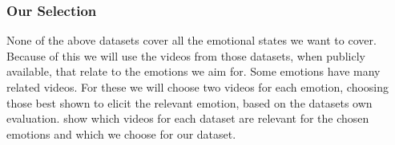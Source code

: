\subsubsection{Our Selection}
None of the above datasets cover all the emotional states we want to cover. Because of this we will use the videos from those datasets, when publicly available, that relate to the emotions we aim for. Some emotions have many related videos. For these we will choose two videos for each emotion, choosing those best shown to elicit the relevant emotion, based on the datasets own evaluation.  show which videos for each dataset are relevant for the chosen emotions and which we choose for our dataset.

